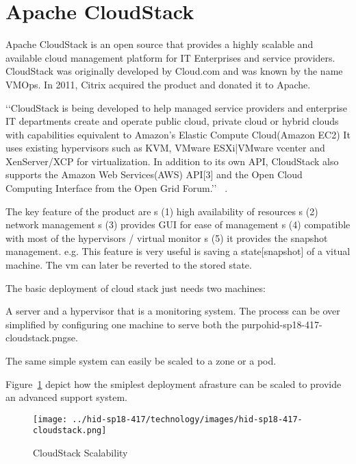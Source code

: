 
\section{Apache CloudStack}

Apache CloudStack is an open source that provides a highly scalable
and available cloud management platform for IT Enterprises and service
providers. CloudStack was originally developed by Cloud.com and was
known by the name VMOps.  In 2011, Citrix acquired the product and
donated it to Apache.

‘‘CloudStack is being developed to help managed service providers and
enterprise IT departments create and operate public cloud, private
cloud or hybrid clouds with capabilities equivalent to Amazon's
Elastic Compute Cloud(Amazon EC2) It uses existing hypervisors such
as KVM, VMware ESXi|VMware vcenter and XenServer/XCP for
virtualization. In addition to its own API, CloudStack also supports
the Amazon Web Services(AWS) API[3] and the Open Cloud Computing
Interface from the Open Grid Forum.’’ ~\cite{
  hid-sp18-417-wiki-cloudStack}.

The key feature of the product are 
s (1) high availability of resources
s (2) network management
s (3) provides GUI for ease of management
s (4) compatible with most of the hypervisors / virtual monitor
s (5) it provides the snapshot management. e.g. This feature is 
very useful is saving a state[snapshot] of a vitual machine. 
The vm can later be reverted to the stored state.  

The basic deployment of cloud stack just needs two machines: 
 
A server and a hypervisor that is a monitoring system.  The process
can be over simplified by configuring one machine to serve both the
purpohid-sp18-417-cloudstack.pngse.
 
The same simple system can easily be scaled to a zone or a pod.

Figure~\ref{F:cloudstack-scalabuility} depict how the smiplest
deployment afrasture can be scaled to provide an advanced support
system.

\begin{figure}[htb]
  \texttt{[image: ../hid-sp18-417/technology/images/hid-sp18-417-cloudstack.png]}
  \caption{CloudStack Scalability~\cite{hid-sp18-417-cloudstack-scaling}}
  \label{F:cloudstack-scalabuility}
\end{figure}


